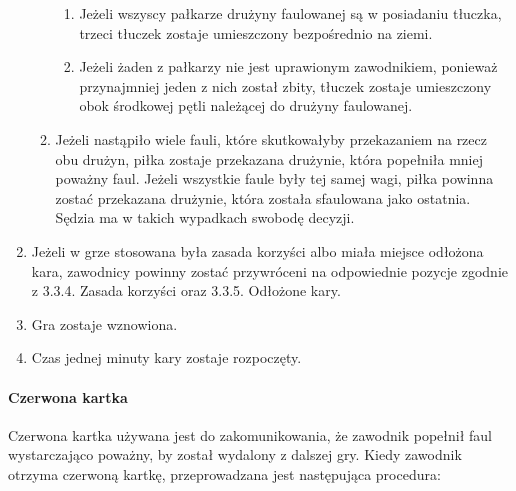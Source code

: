 \documentclass[12pt]{article}
\begin{document}
\begin{enumerate}
\begin{enumerate}
		            \begin{enumerate}
			            \item
			                  Jeżeli wszyscy pałkarze drużyny faulowanej są w posiadaniu
			                  tłuczka, trzeci tłuczek zostaje umieszczony bezpośrednio na ziemi.
			            \item
			                  Jeżeli żaden z pałkarzy nie jest uprawionym zawodnikiem, ponieważ
			                  przynajmniej jeden z nich został zbity, tłuczek zostaje
			                  umieszczony obok środkowej pętli należącej do drużyny faulowanej.
		            \end{enumerate}
		      \item
		            Jeżeli nastąpiło wiele fauli, które skutkowałyby przekazaniem na
		            rzecz obu drużyn, piłka zostaje przekazana drużynie, która popełniła
		            mniej poważny faul. Jeżeli wszystkie faule były tej samej wagi,
		            piłka powinna zostać przekazana drużynie, która została sfaulowana
		            jako ostatnia. Sędzia ma w takich wypadkach swobodę decyzji.
	      \end{enumerate}
	\item
	      Jeżeli w grze stosowana była zasada korzyści albo miała miejsce
	      odłożona kara, zawodnicy powinny zostać przywróceni na odpowiednie
	      pozycje zgodnie z 3.3.4. Zasada korzyści oraz 3.3.5. Odłożone kary.
	\item
	      Gra zostaje wznowiona.
	\item
	      Czas jednej minuty kary zostaje rozpoczęty.
\end{enumerate}

\paragraph{Czerwona kartka}
Czerwona kartka używana jest do
zakomunikowania, że zawodnik popełnił faul wystarczająco poważny, by
został wydalony z dalszej gry. Kiedy zawodnik otrzyma czerwoną kartkę,
przeprowadzana jest następująca procedura:
\end{document}

